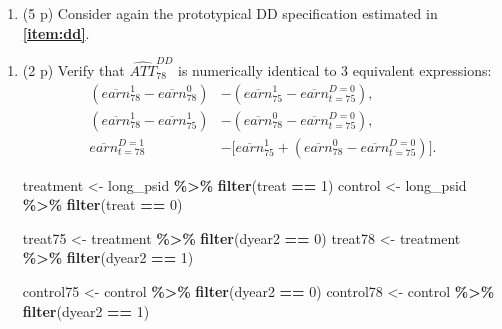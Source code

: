 \documentclass[
]{article}
\newenvironment{Shaded}{\begin{snugshade}}{\end{snugshade}}
\newcommand{\DecValTok}[1]{\textcolor[rgb]{0.00,0.00,0.81}{#1}}
\newcommand{\FunctionTok}[1]{\textcolor[rgb]{0.13,0.29,0.53}{\textbf{#1}}}
\newcommand{\NormalTok}[1]{#1}
\newcommand{\OtherTok}[1]{\textcolor[rgb]{0.56,0.35,0.01}{#1}}
\newcommand{\SpecialCharTok}[1]{\textcolor[rgb]{0.81,0.36,0.00}{\textbf{#1}}}
\providecommand{\tightlist}{%
  \setlength{\itemsep}{0pt}\setlength{\parskip}{0pt}}
\begin{document}
\begin{enumerate}
\def\labelenumi{\arabic{enumi}.}
\setcounter{enumi}{6}
\tightlist
\item
  (5 p) Consider again the prototypical DD specification estimated in
  \textbf{\ref{item:dd}}.
\end{enumerate}

\begin{enumerate}
\def\labelenumi{\alph{enumi}.}
\item
  (2 p) Verify that \(\widehat{ATT}_{78}^{DD}\) is numerically identical
  to 3 equivalent expressions:\label{item:DinD-diff} \begin{align}
   \left( \overline{earn}_{78}^{1}-\overline{earn}_{78}^{0}\right) &-\left( \overline{earn}_{75}^{1}-\overline{earn}_{t=75}^{D=0}\right),\label{eq:DDv1} \\
   \left( \overline{earn}_{78}^{1} -\overline{earn}_{75}^{1}\right) &-\left( \overline{earn}_{78}^{0}-\overline{earn}_{t=75}^{D=0}\right),\label{eq:DDv2} \\ 
   \overline{earn}_{t=78}^{D=1} &- \big[ \overline{earn}_{75}^{1}+ \left( \overline{earn}_{78}^{0}-\overline{earn}_{t=75}^{D=0}\right) \big].\label{eq:DDv3}
   \end{align}

\begin{Shaded}
\begin{Highlighting}[]
\NormalTok{treatment }\OtherTok{\textless{}{-}}\NormalTok{ long\_psid }\SpecialCharTok{\%\textgreater{}\%} \FunctionTok{filter}\NormalTok{(treat }\SpecialCharTok{==} \DecValTok{1}\NormalTok{)}
\NormalTok{control }\OtherTok{\textless{}{-}}\NormalTok{ long\_psid }\SpecialCharTok{\%\textgreater{}\%} \FunctionTok{filter}\NormalTok{(treat }\SpecialCharTok{==} \DecValTok{0}\NormalTok{)}

\NormalTok{treat75 }\OtherTok{\textless{}{-}}\NormalTok{ treatment }\SpecialCharTok{\%\textgreater{}\%} \FunctionTok{filter}\NormalTok{(dyear2 }\SpecialCharTok{==} \DecValTok{0}\NormalTok{)}
\NormalTok{treat78 }\OtherTok{\textless{}{-}}\NormalTok{ treatment }\SpecialCharTok{\%\textgreater{}\%} \FunctionTok{filter}\NormalTok{(dyear2 }\SpecialCharTok{==} \DecValTok{1}\NormalTok{)}

\NormalTok{control75 }\OtherTok{\textless{}{-}}\NormalTok{ control }\SpecialCharTok{\%\textgreater{}\%} \FunctionTok{filter}\NormalTok{(dyear2 }\SpecialCharTok{==} \DecValTok{0}\NormalTok{)}
\NormalTok{control78 }\OtherTok{\textless{}{-}}\NormalTok{ control }\SpecialCharTok{\%\textgreater{}\%} \FunctionTok{filter}\NormalTok{(dyear2 }\SpecialCharTok{==} \DecValTok{1}\NormalTok{)}
\end{Highlighting}
\end{Shaded}


\end{enumerate}
\end{document}
